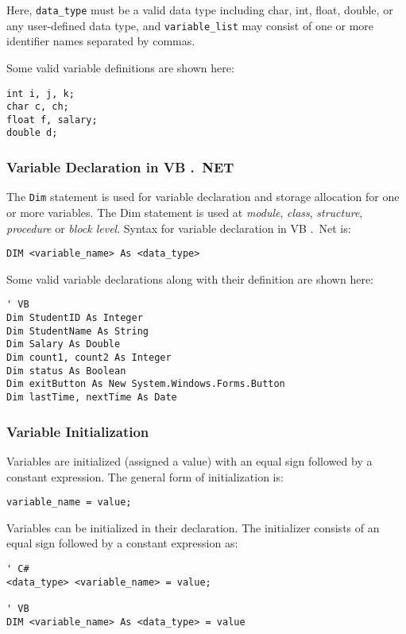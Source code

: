 Here, \verb|data_type| must be a valid {\cs} data type including char, int, float, double, or any user-defined data type, and \verb|variable_list| may consist of one or more identifier names separated by commas.

Some valid variable definitions are shown here:
\begin{lstlisting}[numbers=none]
int i, j, k;
char c, ch;
float f, salary;
double d;
\end{lstlisting}

\subsubsection*{Variable Declaration in VB .\ NET}
The \texttt{Dim} statement is used for variable declaration and storage allocation for one or more variables. The Dim statement
is used at \textit{module}, \textit{class}, \textit{structure}, \textit{procedure} or \textit{block level}.
Syntax for variable declaration in VB .\ Net is:
\begin{lstlisting}[style=vb, numbers=none]
	DIM <variable_name> As <data_type>
\end{lstlisting}

Some valid variable declarations along with their definition are shown here:
\begin{lstlisting}[style=vb, numbers=none]
' VB
Dim StudentID As Integer
Dim StudentName As String
Dim Salary As Double
Dim count1, count2 As Integer
Dim status As Boolean
Dim exitButton As New System.Windows.Forms.Button
Dim lastTime, nextTime As Date
\end{lstlisting}

\subsubsection*{Variable Initialization}
Variables are initialized (assigned a value) with an equal sign followed by a constant expression. The general form of initialization is:

\begin{lstlisting}[numbers=none]
variable_name = value;
\end{lstlisting}

Variables can be initialized in their declaration. The initializer consists of an equal sign followed by a constant expression as:

\begin{lstlisting}[style=vb, numbers=none]
' C#
<data_type> <variable_name> = value;

' VB
DIM <variable_name> As <data_type> = value
\end{lstlisting}

